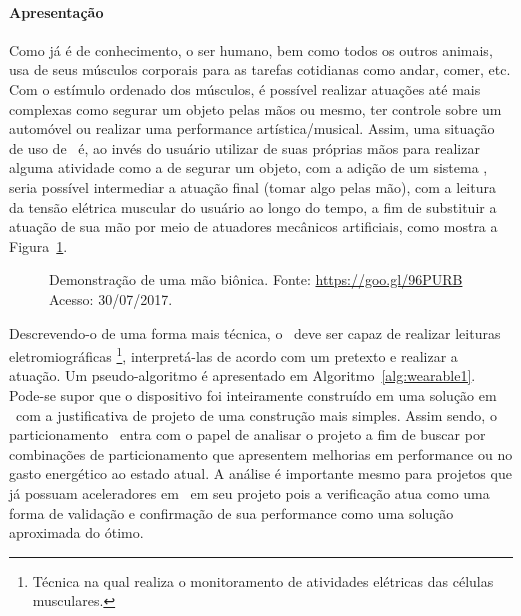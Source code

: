       \paragraph{Apresentação}
         Como já é de conhecimento, o ser humano, bem como todos os outros animais, usa de seus músculos corporais para as tarefas cotidianas como andar, comer, etc.
         Com o estímulo ordenado dos músculos, é possível realizar atuações até mais complexas como segurar um objeto pelas mãos ou mesmo, ter controle sobre um automóvel ou realizar uma performance artística/musical.
         Assim, uma situação de uso de \wearable\ é, ao invés do usuário utilizar de suas próprias mãos para realizar alguma atividade como a de segurar um objeto, com a adição de um sistema \wearable, seria possível intermediar a atuação final (tomar algo pelas mão), com a leitura da tensão elétrica muscular do usuário ao longo do tempo, a fim de substituir a atuação de sua mão por meio de atuadores mecânicos artificiais, como mostra a Figura~\ref{fig:maobionica}.

         \begin{figure}[h] \centering
            \caption{Demonstração de uma mão biônica. Fonte: \url{https://goo.gl/96PURB} Acesso: 30/07/2017.}
            \label{fig:maobionica}
         \end{figure}

         Descrevendo-o de uma forma mais técnica, o \wearable\ deve ser capaz de realizar leituras eletromiográficas%
         \footnote{Técnica na qual realiza o monitoramento de atividades elétricas das células musculares.},
         interpretá-las de acordo com um pretexto e realizar a atuação.
         Um pseudo-algoritmo é apresentado em Algoritmo~\ref{alg:wearable1}.
         Pode-se supor que o dispositivo foi inteiramente construído em uma solução em \software\ com a justificativa de projeto de uma construção mais simples.
         Assim sendo, o particionamento \hs\ entra com o papel de analisar o projeto a fim de buscar por combinações de particionamento que apresentem melhorias em performance ou no gasto energético ao estado atual.
         A análise é importante mesmo para projetos que já possuam aceleradores em \hardware\ em seu projeto pois a verificação atua como uma forma de validação e confirmação de sua performance como uma solução aproximada do ótimo.

